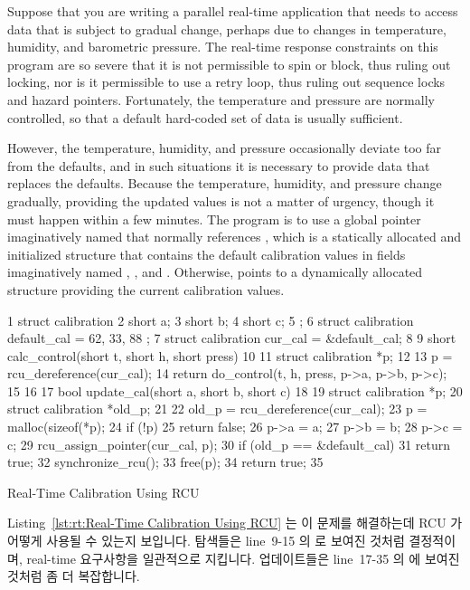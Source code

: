 Suppose that you are writing a parallel real-time application that needs
to access
data that is subject to gradual change, perhaps due to changes in
temperature, humidity, and barometric pressure.
The real-time response constraints on this program are so severe that
it is not permissible to spin or block, thus ruling out locking,
nor is it permissible to use a retry loop, thus ruling out sequence locks
and hazard pointers.
Fortunately, the temperature and pressure are normally controlled,
so that a default hard-coded set of data is usually sufficient.

However, the temperature, humidity, and pressure occasionally deviate too far
from the defaults, and in such situations it is necessary to provide
data that replaces the defaults.
Because the temperature, humidity, and pressure change gradually,
providing the updated values is not a matter of urgency, though
it must happen within a few minutes.
The program is to use a global pointer imaginatively named 
that normally references , which is a statically allocated
and initialized structure that contains the default calibration values
in fields imaginatively named , , and .
Otherwise,  points to a dynamically allocated
structure providing the current calibration values.
\fi

\begin{listing}[tb]
{ \scriptsize
\begin{verbbox}
 1 struct calibration {
 2   short a;
 3   short b;
 4   short c;
 5 };
 6 struct calibration default_cal = { 62, 33, 88 };
 7 struct calibration cur_cal = &default_cal;
 8
 9 short calc_control(short t, short h, short press)
10 {
11   struct calibration *p;
12
13   p = rcu_dereference(cur_cal);
14   return do_control(t, h, press, p->a, p->b, p->c);
15 }
16
17 bool update_cal(short a, short b, short c)
18 {
19   struct calibration *p;
20   struct calibration *old_p;
21
22   old_p = rcu_dereference(cur_cal);
23   p = malloc(sizeof(*p);
24   if (!p)
25     return false;
26   p->a = a;
27   p->b = b;
28   p->c = c;
29   rcu_assign_pointer(cur_cal, p);
30   if (old_p == &default_cal)
31     return true;
32   synchronize_rcu();
33   free(p);
34   return true;
35 }
\end{verbbox}
}
\centering
\theverbbox
\caption{Real-Time Calibration Using RCU}
\label{lst:advsync:Real-Time Calibration Using RCU}
\end{listing}

Listing~\ref{lst:rt:Real-Time Calibration Using RCU}
는 이 문제를 해결하는데 RCU 가 어떻게 사용될 수 있는지 보입니다.
탐색들은 line~9-15 의  로 보여진 것처럼 결정적이며,
real-time 요구사항을 일관적으로 지킵니다.
업데이트들은 line~17-35 의  에 보여진 것처럼 좀 더 복잡합니다.
\iffalse

